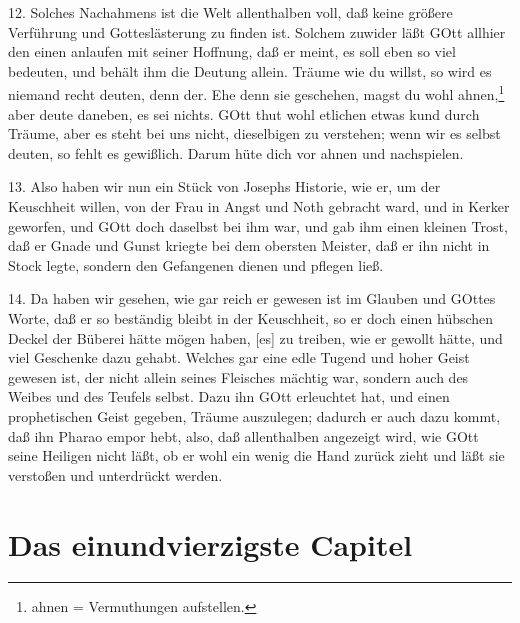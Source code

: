 12. Solches Nachahmens ist die Welt allenthalben voll, daß keine größere Verführung und Gotteslästerung zu finden ist. Solchem zuwider läßt GOtt allhier den einen anlaufen mit seiner Hoffnung, daß er meint, es soll eben so viel bedeuten, und behält ihm die Deutung allein. Träume wie du willst, so wird es niemand recht deuten, denn der. Ehe denn sie geschehen, magst du wohl ahnen,\footnote{ahnen = Vermuthungen aufstellen.} aber deute daneben, es sei nichts. GOtt thut wohl etlichen etwas kund durch Träume, aber es steht bei uns nicht, dieselbigen zu verstehen; wenn wir es selbst deuten, so fehlt es gewißlich. Darum hüte dich vor ahnen und nachspielen.

13. Also haben wir nun ein Stück von Josephs Historie, wie er, um der Keuschheit willen, von der Frau in Angst und Noth gebracht ward, und in Kerker geworfen, und GOtt doch daselbst bei ihm war, und gab ihm einen kleinen Trost, daß er Gnade und Gunst kriegte bei dem obersten Meister, daß er ihn nicht in Stock legte, sondern den Gefangenen dienen und pflegen ließ.

14. Da haben wir gesehen, wie gar reich er gewesen ist im Glauben und GOttes Worte, daß er so beständig bleibt in der Keuschheit, so er doch einen hübschen Deckel der Büberei hätte mögen haben, [es] zu treiben, wie er gewollt hätte, und viel Geschenke dazu gehabt. Welches gar eine edle Tugend und hoher Geist gewesen ist, der nicht allein seines Fleisches mächtig war, sondern auch des Weibes und des Teufels selbst. Dazu ihn GOtt erleuchtet hat, und einen prophetischen Geist gegeben, Träume auszulegen; dadurch er auch dazu kommt, daß ihn Pharao empor hebt, also, daß allenthalben angezeigt wird, wie GOtt seine Heiligen nicht läßt, ob er wohl ein wenig die Hand zurück zieht und läßt sie verstoßen und unterdrückt werden.

\section{Das einundvierzigste Capitel}


